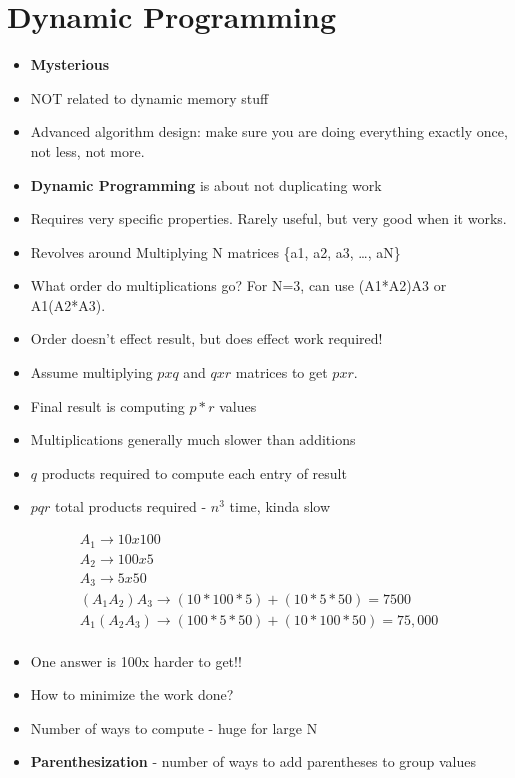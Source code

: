 \documentclass[12pt, letter]{article}
\begin{document}
\section{Dynamic Programming}%
\label{sec:dynamic_programming}
\begin{itemize}
	\item \textbf{Mysterious}
	\item NOT related to dynamic memory stuff
	\item Advanced algorithm design: make sure you are doing everything exactly once, not less, not more.
	\item \textbf{Dynamic Programming} is about not duplicating work
	\item Requires very specific properties. Rarely useful, but very good when it works.
	\item Revolves around Multiplying N matrices \{a1, a2, a3, \ldots, aN\}
	\item What order do multiplications go? For N=3, can use (A1*A2)A3 or A1(A2*A3).
	\item Order doesn't effect result, but does effect work required!
	\item Assume multiplying $pxq$ and $qxr$ matrices to get $pxr$.
	\item Final result is computing $p*r$ values
	\item Multiplications generally much slower than additions
	\item $q$ products required to compute each entry of result
	\item $pqr$ total products required - $n^3$ time, kinda slow
\end{itemize}

\begin{gather*}
A_1 \rightarrow 10 x 100 \\
A_2 \rightarrow 100 x 5 \\
A_3 \rightarrow 5 x 50 \\
(A_1A_2)A_3 \rightarrow (10*100*5)+(10*5*50) = 7500 \\
A_1(A_2A_3) \rightarrow (100*5*50)+(10*100*50) = 75,000 \\
\end{gather*}

\begin{itemize}
	\item One answer is 100x harder to get!!
	\item How to minimize the work done?
	\item Number of ways to compute - huge for large N
	\item \textbf{Parenthesization} - number of ways to add parentheses to group values
\end{itemize}
\end{document}
